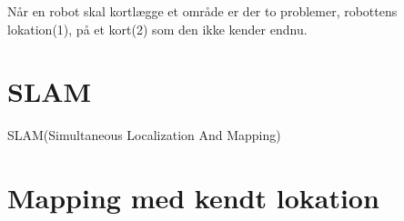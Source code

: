 Når en robot skal kortlægge et område er der to problemer, robottens lokation(1), på et kort(2) som den ikke kender endnu.

\section{SLAM}
SLAM(Simultaneous Localization And Mapping)

\section{Mapping med kendt lokation}